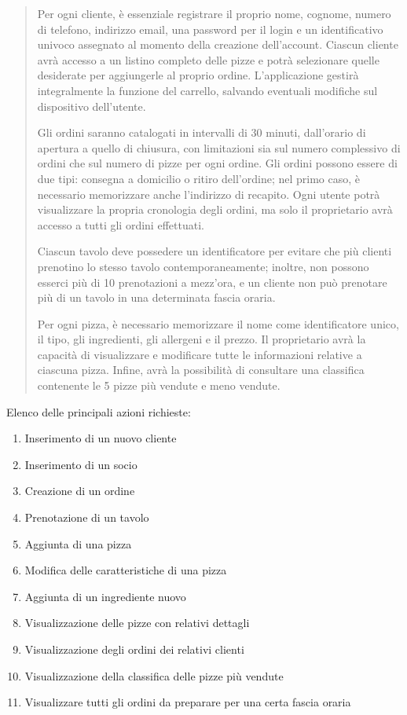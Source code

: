 \documentclass[a4paper,12pt, oneside]{article}
\begin{document}
\begin{quote}

Per ogni cliente, è essenziale registrare il proprio nome, cognome,
numero di telefono, indirizzo email, una password per il login e un
identificativo univoco assegnato al momento della creazione
dell'account. Ciascun cliente avrà accesso a un listino completo delle
pizze e potrà selezionare quelle desiderate per aggiungerle al proprio
ordine. L'applicazione gestirà integralmente la funzione del carrello,
salvando eventuali modifiche sul dispositivo dell'utente.

Gli ordini saranno catalogati in intervalli di 30 minuti,
dall'orario di apertura a quello di chiusura, con limitazioni sia sul
numero complessivo di ordini che sul numero di pizze per ogni ordine.
Gli ordini possono essere di due tipi: consegna a domicilio o ritiro
dell'ordine; nel primo caso, è necessario memorizzare anche
l'indirizzo di recapito. Ogni utente potrà visualizzare la propria
cronologia degli ordini, ma solo il proprietario avrà accesso a tutti
gli ordini effettuati.

Ciascun tavolo deve possedere un identificatore per evitare che più
clienti prenotino lo stesso tavolo contemporaneamente; inoltre, non
possono esserci più di 10 prenotazioni a mezz'ora, e un cliente non
può prenotare più di un tavolo in una determinata fascia oraria.

Per ogni pizza, è necessario memorizzare il nome come identificatore
unico, il tipo, gli ingredienti, gli allergeni e il prezzo. Il
proprietario avrà la capacità di visualizzare e modificare tutte le
informazioni relative a ciascuna pizza. Infine, avrà la possibilità
di consultare una classifica contenente le 5 pizze più vendute e
meno vendute.

\end{quote}

Elenco delle principali azioni richieste:
\begin{enumerate}
    \item Inserimento di un nuovo cliente
    \item Inserimento di un socio
    \item Creazione di un ordine
    \item Prenotazione di un tavolo
    \item Aggiunta di una pizza
    \item Modifica delle caratteristiche di una pizza
    \item Aggiunta di un ingrediente nuovo
    \item Visualizzazione delle pizze con relativi dettagli
    \item Visualizzazione degli ordini dei relativi clienti
    \item Visualizzazione della classifica delle pizze più vendute
    \item Visualizzare tutti gli ordini da preparare per una certa fascia oraria
\end{enumerate}
\end{document}
